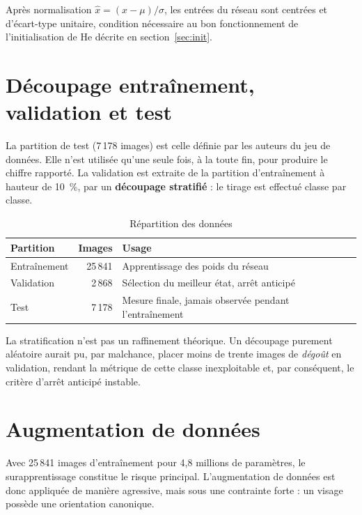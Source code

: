 \documentclass[a4paper,12pt]{report}
\begin{document}
Après normalisation $\hat{x} = (x - \mu)/\sigma$, les entrées du réseau sont
centrées et d'écart-type unitaire, condition nécessaire au bon fonctionnement de
l'initialisation de He décrite en section~\ref{sec:init}.

\section{Découpage entraînement, validation et test}

La partition de test (7\,178 images) est celle définie par les auteurs du jeu de
données. Elle n'est utilisée qu'une seule fois, à la toute fin, pour produire le
chiffre rapporté. La validation est extraite de la partition d'entraînement à
hauteur de 10~\%, par un \textbf{découpage stratifié} : le tirage est effectué
classe par classe.

\begin{table}[htbp]
\centering
\caption{Répartition des données}
\begin{tabular}{|l|r|p{7cm}|}
\hline
\textbf{Partition} & \textbf{Images} & \textbf{Usage} \\
\hline
Entraînement & 25\,841 & Apprentissage des poids du réseau \\
Validation & 2\,868 & Sélection du meilleur état, arrêt anticipé \\
Test & 7\,178 & Mesure finale, jamais observée pendant l'entraînement \\
\hline
\end{tabular}
\end{table}

La stratification n'est pas un raffinement théorique. Un découpage purement
aléatoire aurait pu, par malchance, placer moins de trente images de
\emph{dégoût} en validation, rendant la métrique de cette classe inexploitable
et, par conséquent, le critère d'arrêt anticipé instable.

\section{Augmentation de données}

Avec 25\,841 images d'entraînement pour 4{,}8 millions de paramètres, le
surapprentissage constitue le risque principal. L'augmentation de données est
donc appliquée de manière agressive, mais sous une contrainte forte : un visage
possède une orientation canonique.
\end{document}

